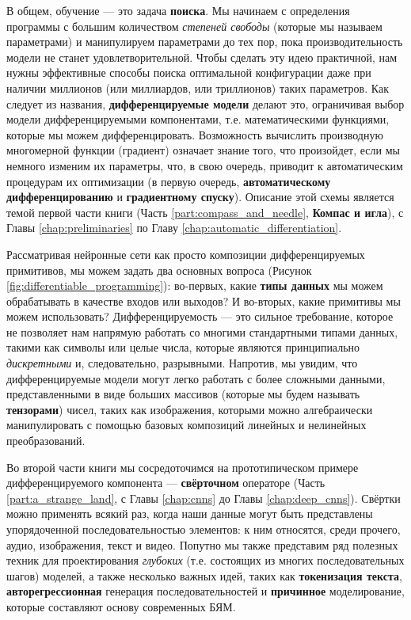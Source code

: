 В общем, обучение — это задача \textbf{поиска}. Мы начинаем с определения программы с большим количеством \textit{степеней свободы} (которые мы называем параметрами) и манипулируем параметрами до тех пор, пока производительность модели не станет удовлетворительной. Чтобы сделать эту идею практичной, нам нужны эффективные способы поиска оптимальной конфигурации даже при наличии миллионов (или миллиардов, или триллионов) таких параметров. Как следует из названия, \textbf{дифференцируемые модели} делают это, ограничивая выбор модели дифференцируемыми компонентами, т.е. математическими функциями, которые мы можем дифференцировать. Возможность вычислить производную многомерной функции (градиент) означает знание того, что произойдет, если мы немного изменим их параметры, что, в свою очередь, приводит к автоматическим процедурам их оптимизации (в первую очередь, \textbf{автоматическому дифференцированию} и \textbf{градиентному спуску}). Описание этой схемы является темой первой части книги (Часть \ref{part:compass_and_needle}, \textbf{Компас и игла}), с Главы \ref{chap:preliminaries} по Главу \ref{chap:automatic_differentiation}.

Рассматривая нейронные сети как просто композиции дифференцируемых примитивов, мы можем задать два основных вопроса (Рисунок \ref{fig:differentiable_programming}): во-первых, какие \textbf{типы данных} мы можем обрабатывать в качестве входов или выходов? И во-вторых, какие примитивы мы можем использовать? Дифференцируемость — это сильное требование, которое не позволяет нам напрямую работать со многими стандартными типами данных, такими как символы или целые числа, которые являются принципиально \textit{дискретными} и, следовательно, разрывными. Напротив, мы увидим, что дифференцируемые модели могут легко работать с более сложными данными, представленными в виде больших массивов (которые мы будем называть \textbf{тензорами}) чисел, таких как изображения, которыми можно алгебраически манипулировать с помощью базовых композиций линейных и нелинейных преобразований.

Во второй части книги мы сосредоточимся на прототипическом примере дифференцируемого компонента — \textbf{свёрточном} операторе (Часть \ref{part:a_strange_land}, с Главы \ref{chap:cnns} до Главы \ref{chap:deep_cnns}). Свёртки можно применять всякий раз, когда наши данные могут быть представлены упорядоченной последовательностью элементов: к ним относятся, среди прочего, аудио, изображения, текст и видео. Попутно мы также представим ряд полезных техник для проектирования \textit{глубоких} (т.е. состоящих из многих последовательных шагов) моделей, а также несколько важных идей, таких как \textbf{токенизация текста}, \textbf{авторегрессионная} генерация последовательностей и \textbf{причинное} моделирование, которые составляют основу современных БЯМ.

